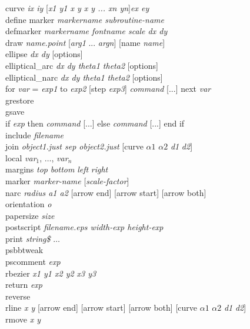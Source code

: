 {\sf curve {\it ix iy }[{\it x1 y1 x y x y ... xn yn}]{\it ex ey }}  \\
{\sf define marker {\it markername  subroutine-name}} \\
{\sf defmarker {\it markername  fontname scale dx dy}} \\
{\sf draw {\it name.point} [{\it arg1} ... {\it argn}] [name {\it name}]} \\
{\sf ellipse {\it dx dy} [options]} \\
{\sf elliptical\_arc {\it dx dy theta1 theta2} [options]} \\
{\sf elliptical\_narc {\it dx dy theta1 theta2} [options]} \\
{\sf for {\it var} = {\it exp1} to {\it exp2} [step {\it exp3}] {\it command} [...] next {\it var}}  \\
{\sf grestore}  \\
{\sf gsave}  \\
{\sf if {\it exp} then {\it command} [...] else {\it command} [...] end if}  \\
{\sf include {\it filename}}  \\
{\sf join {\it object1.just sep object2.just} [curve {\it $\alpha1$} {\it $\alpha2$} {\it d1} {\it d2}]}   \\
{\sf local {\it var}$_1$, $\ldots$, {\it var}$_n$} \\
{\sf margins {\it top} {\it bottom} {\it left} {\it right}} \\
{\sf marker {\it marker-name} [{\it scale-factor}]}  \\
{\sf narc {\it radius a1 a2} [arrow end] [arrow start] [arrow both]} \\
{\sf orientation {\it o}} \\
{\sf papersize {\it size}} \\
{\sf postscript {\it filename.eps  width-exp height-exp}}   \\
{\sf print {\it string\$} $\ldots$} \\
{\sf psbbtweak} \\
{\sf pscomment} {\it exp} \\
{\sf rbezier {\it x1 y1 x2 y2 x3 y3}}  \\
{\sf return} {\it exp}  \\
{\sf reverse }  \\
{\sf rline {\it x y} [arrow end] [arrow start] [arrow both]  [curve {\it $\alpha1$} {\it $\alpha2$} {\it d1} {\it d2}]}   \\
{\sf rmove {\it x y}}  \\
